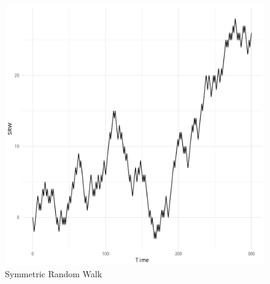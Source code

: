 \documentclass{article}\usepackage[]{graphicx}\usepackage[]{color}
\newenvironment{knitrout}{}{} %
\begin{document}
\begin{figure}[!h]
\begin{center}

\begin{knitrout}
\color{fgcolor}
\includegraphics[width=1\linewidth]{figure/unnamed-chunk-4-1} 

\end{knitrout}


\end{center}
\caption{Symmetric Random Walk}
\end{figure}
\end{document}
